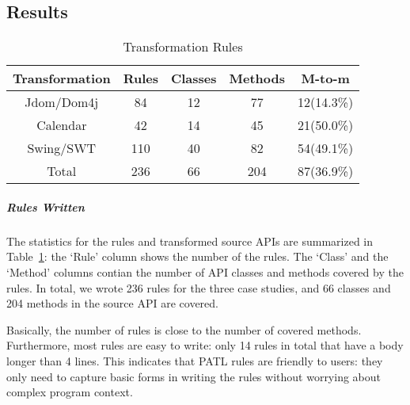 \documentclass[letterpaper, USenglish]{lipics-v2016}
\newcommand{\PATL}{PATL\xspace}
\theoremstyle{plain}
\begin{document}
\subsection{Results}

\begin{table}
  \centering
  \caption{Transformation Rules}
  \label{tbl:rules}
  \footnotesize
  \begin{tabular}{|c|c|c|c|c|}
    \hline
    Transformation & Rules & Classes & Methods & M-to-m\\
    \hline \hline
    Jdom/Dom4j & 84 & 12 & 77  & 12(14.3\%) \\
    \hline
    Calendar & 42 & 14 & 45 & 21(50.0\%) \\
    \hline
    Swing/SWT & 110 & 40 & 82 & 54(49.1\%) \\
    \hline
    \hline
    Total & 236 & 66 & 204 & 87(36.9\%) \\ 
    \hline
  \end{tabular}
\end{table}

\subparagraph*{Rules Written}
The statistics for the rules and transformed source APIs are
summarized in Table~\ref{tbl:rules}: the `Rule' column shows the
number of the rules. The `Class' and the `Method' columns contian the number of
API classes and methods covered by the rules. In total, we wrote 236
rules for the three case studies, and 66 classes and
204 methods in the source API are covered.

Basically, the number of rules is close to the number of covered methods. Furthermore, most rules are easy to write: only
14 rules in total that have a body longer than 4 lines. This indicates that \PATL rules are friendly to users: they only need to capture basic forms in writing the rules without worrying about complex program context.
\end{document}
